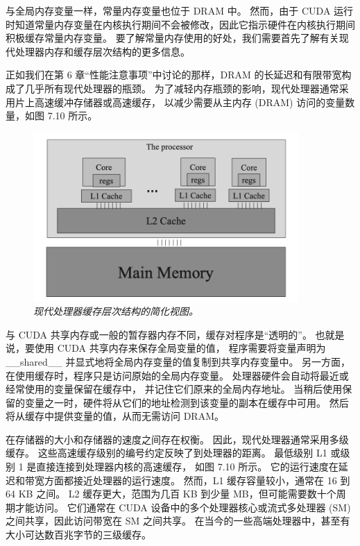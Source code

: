 与全局内存变量一样，常量内存变量也位于 DRAM 中。 
然而，由于 CUDA 运行时知道常量内存变量在内核执行期间不会被修改，因此它指示硬件在内核执行期间积极缓存常量内存变量。 
要了解常量内存使用的好处，我们需要首先了解有关现代处理器内存和缓存层次结构的更多信息。

正如我们在第 6 章“性能注意事项”中讨论的那样，DRAM 的长延迟和有限带宽构成了几乎所有现代处理器的瓶颈。 
为了减轻内存瓶颈的影响，现代处理器通常采用片上高速缓冲存储器或高速缓存，
以减少需要从主内存 (DRAM) 访问的变量数量，如图 7.10 所示。

\begin{figure}[H]
	\centering
	\includegraphics[width=0.9\textwidth]{figs/F7.10.png}
	\caption{\textit{现代处理器缓存层次结构的简化视图。}}
\end{figure}

与 CUDA 共享内存或一般的暂存器内存不同，缓存对程序是“透明的”。 
也就是说，要使用 CUDA 共享内存来保存全局变量的值，
程序需要将变量声明为 \_\_shared\_\_ 并显式地将全局内存变量的值复制到共享内存变量中。 
另一方面，在使用缓存时，程序只是访问原始的全局内存变量。 处理器硬件会自动将最近或经常使用的变量保留在缓存中，
并记住它们原来的全局内存地址。 当稍后使用保留的变量之一时，硬件将从它们的地址检测到该变量的副本在缓存中可用。 
然后将从缓存中提供变量的值，从而无需访问 DRAM。

在存储器的大小和存储器的速度之间存在权衡。 因此，现代处理器通常采用多级缓存。 
这些高速缓存级别的编号约定反映了到处理器的距离。 最低级别 L1 或级别 1 是直接连接到处理器内核的高速缓存，
如图 7.10 所示。 它的运行速度在延迟和带宽方面都接近处理器的运行速度。 
然而，L1 缓存容量较小，通常在 16 到 64 KB 之间。 
L2 缓存更大，范围为几百 KB 到少量 MB，但可能需要数十个周期才能访问。 
它们通常在 CUDA 设备中的多个处理器核心或流式多处理器 (SM) 之间共享，因此访问带宽在 SM 之间共享。 
在当今的一些高端处理器中，甚至有大小可达数百兆字节的三级缓存。

